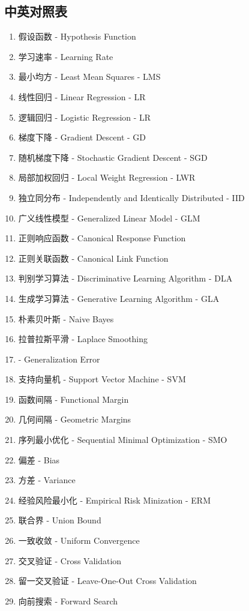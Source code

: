 \subsection{中英对照表}
\begin{enumerate}
	\item 假设函数 - Hypothesis Function
	\item 学习速率 - Learning Rate
	\item 最小均方 - Least Mean Squares - LMS
	\item 线性回归 - Linear Regression - LR
	\item 逻辑回归 - Logistic Regression - LR
	\item 梯度下降 - Gradient Descent - GD
	\item 随机梯度下降 - Stochastic Gradient Descent - SGD
	\item 局部加权回归 - Local Weight Regression - LWR
	\item 独立同分布 - Independently and Identically Distributed - IID
	\item 广义线性模型 - Generalized Linear Model - GLM
	\item 正则响应函数 - Canonical Response Function
	\item 正则关联函数 - Canonical Link Function
	\item 判别学习算法 - Discriminative Learning Algorithm - DLA
	\item 生成学习算法 - Generative Learning Algorithm - GLA
	\item 朴素贝叶斯 - Naive Bayes
	\item 拉普拉斯平滑 - Laplace Smoothing
	\item  - Generalization Error
	\item 支持向量机 - Support Vector Machine - SVM
	\item 函数间隔 - Functional Margin
	\item 几何间隔 - Geometric Margins
	\item 序列最小优化 - Sequential Minimal Optimization - SMO
	\item 偏差 - Bias
	\item 方差 - Variance
	\item 经验风险最小化 - Empirical Risk Minization - ERM
	\item 联合界 - Union Bound
	\item 一致收敛 - Uniform Convergence
	\item 交叉验证 - Cross Validation
	\item 留一交叉验证 - Leave-One-Out Cross Validation
	\item 向前搜索 - Forward Search
	
\end{enumerate}